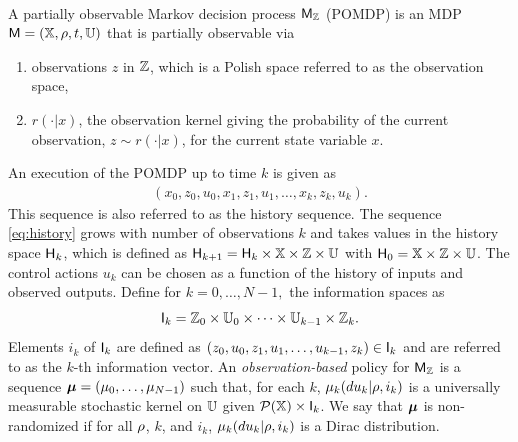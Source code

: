 \documentclass{ifacconf}
\begin{document}
\begin{definition} \label{def:MDP}\mbox{ }\\
A partially observable Markov decision process $\mathsf{M}_{{\mathbb{Z}}}$ (POMDP) is an MDP $\mathsf{M} = ({\mathbb{X}}, \rho, t, {\mathbb{U}})$  that is partially observable via  
\begin{enumerate}
	\item observations $z$ in ${\mathbb{Z}}$,  which is a Polish space referred to as the observation space, %
\item $r(\cdot|x)$,  the observation kernel giving the probability of the current observation,  $z\sim r(\cdot|x)$,  for the current state variable $x$.
\end{enumerate}


\end{definition} 

An execution of the POMDP  up to time $k$ is given as
\begin{align}\label{eq:history} (x_0,z_0,u_0,x_1,z_1,u_1,\ldots,x_k,z_k,u_k).\end{align}
This sequence is also referred to as the history sequence.
The sequence  \eqref{eq:history} grows with number of observations  $k$ and takes values in the history space ${\mathsf{H}}_k$, which is defined as
  ${\mathsf{H}}_{k+1}={\mathsf{H}}_{k}\times{\mathbb{X}}\times{\mathbb{Z}}\times {\mathbb{U}}$ with ${\mathsf{H}}_0={\mathbb{X}}\times{\mathbb{Z}}\times {\mathbb{U}}$.
The control actions $u_k$ can be chosen as a function of the history of inputs and observed outputs.  
Define for $k=0,\ldots,N-1,$ the information spaces as
\[{\mathsf{I}}_k={\mathbb{Z}}_0\times{\mathbb{U}}_0\times\dots\times{\mathbb{U}}_{k-1}\times{\mathbb{Z}}_k.\]
Elements $i_k$ of ${\mathsf{I}}_k$ are defined as $(z_0,u_0,z_1,u_1,\ldots,u_{k-1},z_k)\in{\mathsf{I}}_k$ and are referred to as the $k$-th information vector. 
	An \emph{observation-based} policy for $\mathsf{M}_{{\mathbb{Z}}}$ is a sequence ${\boldsymbol{\mu}}=({\mu}_0,\ldots,{\mu}_{N-1})$ such that, for each $k$, ${\mu}_k(du_k|\rho, i_k)$ is a universally measurable stochastic kernel on ${\mathbb{U}}$  given $\mathcal{P}({\mathbb{X}})\times {\mathsf{I}}_k$.
	We say that ${\boldsymbol{\mu}}$ is non-randomized if for all $\rho$, $k$, and $i_k$,    ${\mu}_k(du_k|\rho, i_k)$ is a Dirac distribution.
\end{document}
